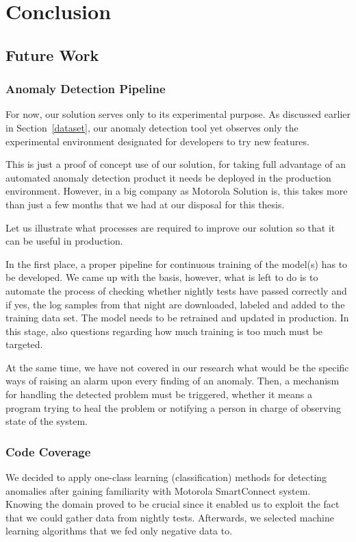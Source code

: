 \chapter*{Conclusion}

\section*{Future Work}
\subsection*{Anomaly Detection Pipeline}
\label{future:pipeline}
For now, our solution serves only to its experimental purpose. 
As discussed earlier in Section~\ref{dataset}, our anomaly detection tool yet observes only the experimental environment designated for developers to try new features. 

This is just a proof of concept use of our solution, for taking full advantage of an automated anomaly detection product it needs be deployed in the production environment. However, in a big company as Motorola Solution is, this takes more than just a few months that we had at our disposal for this thesis.

Let us illustrate what processes are required to improve our solution so that it can be useful in production.

In the first place, a proper pipeline for continuous training of the model(s) has to be developed. We came up with the basis, however, what is left to do is to automate the process of checking whether nightly tests have passed correctly and if yes, the log samples from that night are downloaded, labeled and added to the training data set. The model needs to be retrained and updated in production. In this stage, also questions regarding how much training is too much must be targeted.

At the same time, we have not covered in our research what would be the specific ways of raising an alarm upon every finding of an anomaly. Then, a mechanism for handling the detected problem must be triggered, whether it means a program trying to heal the problem or notifying a person in charge of observing state of the system.


\subsection*{Code Coverage}
\label{code_coverage}
We decided to apply one-class learning (classification) methods for detecting anomalies after gaining familiarity with Motorola SmartConnect system. 
Knowing the domain proved to be crucial since it enabled us to exploit the fact that we could gather data from nightly tests. 
Afterwards, we selected machine learning algorithms that we fed only negative data to.

